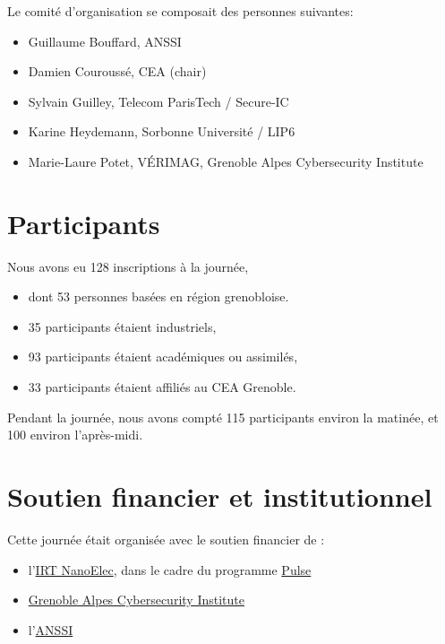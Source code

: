 \documentclass[a4paper,11pt]{article}
\begin{document}
Le comité d'organisation se composait des personnes suivantes:

\begin{itemize}
\item Guillaume Bouffard,  ANSSI
\item Damien Couroussé, CEA  (chair)
\item Sylvain Guilley, Telecom ParisTech / Secure-IC
\item Karine Heydemann, Sorbonne Université / LIP6
\item Marie-Laure Potet, VÉRIMAG,  Grenoble Alpes Cybersecurity Institute
\end{itemize}

\section{Participants}
\label{sec:orge9cbf7a}

Nous avons eu 128 inscriptions à la journée,

\begin{itemize}
\item dont 53 personnes basées en région grenobloise.
\item 35 participants étaient industriels,
\item 93 participants étaient académiques ou assimilés,
\item 33 participants étaient affiliés au CEA Grenoble.
\end{itemize}

Pendant la journée, nous avons compté 115 participants environ la
matinée, et 100 environ l'après-midi.

\section{Soutien financier et institutionnel}
\label{sec:org5f4d5ec}

Cette journée était organisée avec le soutien financier de :

\begin{itemize}
\item l'\href{http://www.irtnanoelec.fr}{IRT NanoElec}, dans le cadre du programme \href{http://www.irtnanoelec.fr/technologies-de-liaison}{Pulse}
\item \href{https://cybersecurity.univ-grenoble-alpes.fr}{Grenoble Alpes Cybersecurity Institute}
\item l'\href{https://www.ssi.gouv.fr}{ANSSI}
\end{itemize}
\end{document}
